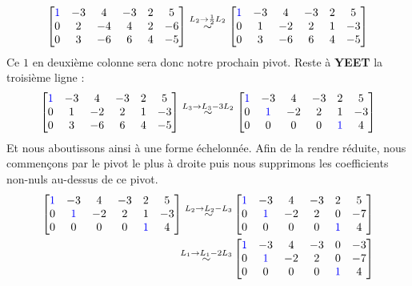 \documentclass{article}
\begin{document}
$$
\begin{bmatrix}
 \color{blue}1 & -3 &  4 & -3 &  2 & 5\\
 0 & 2 &  -4 & 4 &  2 &  -6\\
 0 &  3 & -6 &  6 &  4 & -5
\end{bmatrix}
\overset{L_2 \to \frac{1}{2}L_2}{\sim}
\begin{bmatrix}
 \color{blue}1 & -3 &  4 & -3 &  2 & 5\\
 0 & 1 &  -2 & 2 &  1 &  -3\\
 0 &  3 & -6 &  6 &  4 & -5
\end{bmatrix}
$$
Ce $1$ en deuxième colonne sera donc notre prochain pivot. Reste à \textbf{YEET} la troisième ligne :
$$
\begin{bmatrix}
 \color{blue}1 & -3 &  4 & -3 &  2 & 5\\
 0 & 1 &  -2 & 2 &  1 &  -3\\
 0 &  3 & -6 &  6 &  4 & -5
\end{bmatrix}
\overset{L_3 \to L_3 - 3L_2}{\sim}
\begin{bmatrix}
 \color{blue}1 & -3 &  4 & -3 &  2 & 5\\
 0 & \color{blue}1 &  -2 & 2 &  1 &  -3\\
 0 &  0 & 0 &  0 &  \color{blue}1 & 4
\end{bmatrix}
$$
Et nous aboutissons ainsi à une forme échelonnée. Afin de la rendre réduite, nous commençons par le pivot le plus à droite puis nous supprimons les coefficients non-nuls au-dessus de ce pivot.
\begin{align*}
\begin{bmatrix}
 \color{blue}1 & -3 &  4 & -3 &  2 & 5\\
 0 & \color{blue}1 &  -2 & 2 &  1 &  -3\\
 0 &  0 & 0 &  0 &  \color{blue}1 & 4
\end{bmatrix}
\overset{L_2 \to L_2 - L_3}{\sim}
&\begin{bmatrix}
 \color{blue}1 & -3 &  4 & -3 &  2 & 5\\
 0 & \color{blue}1 &  -2 & 2 &  0 &  -7\\
 0 &  0 & 0 &  0 &  \color{blue}1 & 4
\end{bmatrix}\\
\overset{L_1 \to L_1 - 2L_3}{\sim}
&\begin{bmatrix}
 \color{blue}1 & -3 &  4 & -3 &  0 & -3\\
 0 & \color{blue}1 &  -2 & 2 &  0 &  -7\\
 0 &  0 & 0 &  0 &  \color{blue}1 & 4
\end{bmatrix}
\end{align*}
\end{document}
